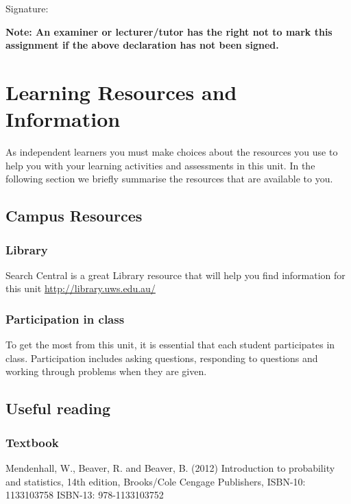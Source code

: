 \documentclass[a4paper,oneside]{book}
\begin{document}
\vspace{1em}
\noindent
Signature: \makebox[3in]{\hrulefill}

\vspace{1em}
\noindent
\textbf{Note: An examiner or lecturer/tutor has the right not to mark this
assignment if the above declaration has not been signed.}

\newpage

\chapter{Learning Resources and Information}

As independent learners you must make choices about the resources you
use to help you with your learning activities and assessments in this
unit.  In the following section we briefly summarise the resources
that are available to you.

\section{Campus Resources}


\subsection*{Library}
\label{sec:library}
Search Central is a great Library resource that will help you find
information for this unit \url{http://library.uws.edu.au/}



\subsection*{Participation in class}

To get the most from this unit, it is essential that each student
participates in class. Participation includes asking questions,
responding to questions and working through problems when they are
given.

\section{Useful reading}

\subsection*{Textbook}
Mendenhall, W., Beaver, R. and Beaver, B. (2012) Introduction to probability and statistics, 14th edition,
Brooks/Cole Cengage Publishers, ISBN-10: 1133103758 ISBN-13: 978-1133103752
\end{document}
